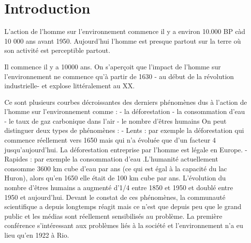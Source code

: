 \section{Introduction}

L’action de l’homme sur l’environnement commence il y a environ 10.000 BP càd 10
000 ans avant 1950. Aujourd’hui l’homme est presque partout sur la terre où son
activité est perceptible partout.

Il commence il y a 10000 ans. On s’aperçoit que l’impact de l’homme sur
l’environnement ne commence qu’à partir de 1630 - au début de la révolution
industrielle- et explose littéralement au XX.

Ce sont plusieurs courbes décroissantes des derniers phénomènes dus à l’action
de l’homme sur l’environnement comme :
- la déforestation
- la consommation d’eau
- le taux de gaz carbonique dans l’air
- le nombre d’êtres humains
On peut distinguer deux types de phénomènes :
- Lents : par exemple la déforestation qui commence réellement vers 1650
mais qui n’a évoluée que d’un facteur 4 jusqu’aujourd’hui. La déforestation
entreprise par l’homme est légale en Europe.
- Rapides : par exemple la consommation d’eau .L’humanité actuellement
consomme 3600 km cube d’eau par ans (ce qui est égal à la capacité du lac
Huron), alors qu’en 1650 elle était de 100 km cube par ans.
L’évolution du nombre d’êtres humains a augmenté d’1/4 entre 1850 et 1950 et
doublé entre 1950 et aujourd’hui. Devant le constat de ces phénomènes, la
communauté scientifique a depuis longtemps réagit mais ce n’est que depuis peu
que le grand public et les médias sont réellement sensibilisés au problème.
La première conférence s’intéressant aux problèmes liés à la société et
l’environnement n’a eu lieu qu’en 1922 à Rio.
